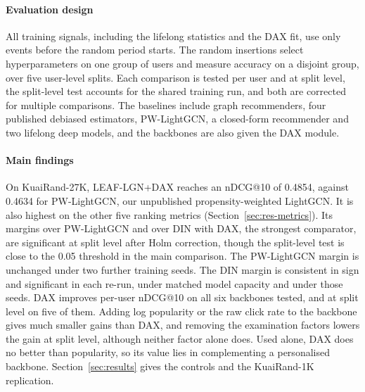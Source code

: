 \paragraph{Evaluation design} All training signals, including the lifelong statistics and the DAX fit, use only events before the
random period starts. The random insertions select hyperparameters on one group of users and measure accuracy on a disjoint group,
over five user-level splits. Each comparison is tested per user and at split level, the split-level test accounts for the shared
training run, and both are corrected for multiple comparisons. The baselines include graph recommenders, four published debiased
estimators, PW-LightGCN, a closed-form recommender and two lifelong deep models, and the backbones are also given the DAX module.

\paragraph{Main findings} On KuaiRand-27K, LEAF-LGN+DAX reaches an nDCG@10 of 0.4854, against 0.4634 for PW-LightGCN, our
unpublished propensity-weighted LightGCN. It is also highest on the other five ranking metrics (Section~\ref{sec:res-metrics}). Its margins over PW-LightGCN and over DIN with DAX, the strongest comparator, are
significant at split level after Holm correction, though the split-level test is close to the 0.05 threshold in the main comparison. The
PW-LightGCN margin is unchanged under two further training seeds. The DIN margin is consistent in sign and significant in each
re-run, under matched model capacity and under those seeds. DAX improves per-user nDCG@10 on all six backbones tested, and at split
level on five of them. Adding log popularity or the raw click rate to the backbone gives much smaller gains than DAX, and removing
the examination factors lowers the gain at split level, although neither factor alone does. Used alone, DAX does no better than
popularity, so its value lies in complementing a personalised backbone. Section~\ref{sec:results} gives the controls and the
KuaiRand-1K replication.


